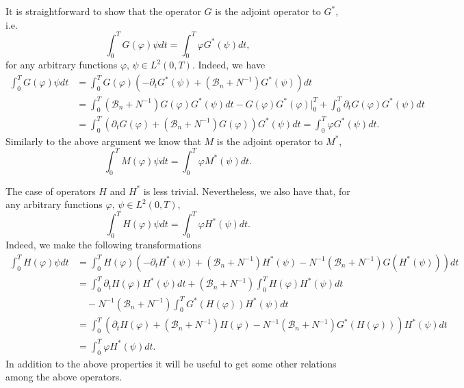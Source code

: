 \documentclass[10pt,a4paper]{amsart}
\numberwithin{equation}{section}
\begin{document}
It is straightforward to show that the operator $G$ is the adjoint operator
to $G^{\ast }$, i.e.
\begin{equation}
\int _0^{T}G(\varphi )\psi {dt}=\int _0^{T}\varphi G^{\ast
}(\psi ){dt},  \label{G adj rel}
\end{equation}%
for any arbitrary functions $\varphi ,\, \psi \in L^2(0,T)$. Indeed, we
have
\begin{align*}
\int _0^{T}G(\varphi )\psi {dt}
&=\int _0^{T}G(\varphi
 )(-\partial _{t}G^{\ast }(\psi )+(\mathcal{B}_n+N^{-1})G^{\ast }(\psi )){dt} \\
&=\int _0^{T}(\mathcal{B}_n+N^{-1})G(\varphi )G^{\ast }(\psi ){dt}%
-G(\varphi )G^{\ast }(\varphi )\Big \vert_0^{T}+\int
_0^{T}\partial _{t}G(\varphi )G^{\ast }(\psi ){dt} \\
&=\int _0^{T}(\partial _{t}G(\varphi )+(\mathcal{B}
_n+N^{-1})G(\varphi ))G^{\ast }(\psi ){dt}=\int _0^{T}\varphi
G^{\ast }(\psi ){dt}.
\end{align*}
Similarly to the above argument we know that $M$ is the adjoint operator to 
$M^{\ast }$,
\[
\int _0^{T}M(\varphi )\psi {dt}=\int _0^{T}\varphi M^{\ast
}(\psi ){dt}.
\]

The case of operators $H$ and $H^{\ast }$ is less trivial. 
Nevertheless, we also have that, for any arbitrary functions 
$\varphi ,\, \psi \in L^2(0,T)$,
\begin{equation}
\int _0^{T}H(\varphi )\psi {dt} 
=\int _0^{T}\varphi H^{\ast
}(\psi ){dt}.  \label{H adj rel}
\end{equation}
Indeed, we make the following transformations
\begin{align*}
\int _0^{T}H(\varphi )\psi {dt}
&=\int _0^{T}H(\varphi )(-\partial _{t}H^{\ast }(\psi )
 +(\mathcal{B}_n+N^{-1})H^{\ast }(\psi)-N^{-1}
  (\mathcal{B}_n+N^{-1})G(H^{\ast }(\psi ))){dt} \\
&=\int _0^{T}\partial _{t}H(\varphi )H^{\ast }(\psi ){dt}
 +(\mathcal{B}_n+N^{-1})\int _0^{T}H(\varphi )H^{\ast }(\psi ){dt} \\
&\quad -N^{-1}(\mathcal{B}_n+N^{-1})\int _0^{T}G^{\ast }(H(\varphi
 ))H^{\ast }(\psi ){dt} \\
&=\int _0^{T}(\partial _{t}H(\varphi )+(\mathcal{B} _n+N^{-1})H(\varphi )
 -N^{-1}(\mathcal{B}_n+N^{-1})G^{\ast }(H(\varphi)))H^{\ast }(\psi ){dt} \\
&=\int _0^{T}\varphi H^{\ast }(\psi ){dt.}
\end{align*}
In addition to the above properties it will be useful to get some other
relations among the above operators.
\end{document}
